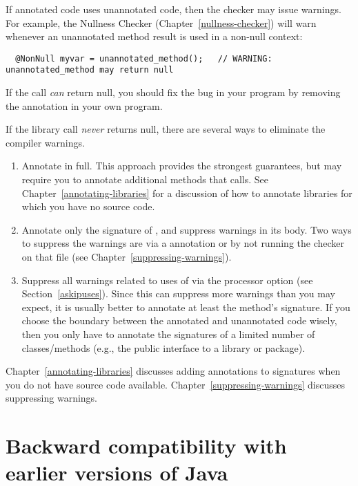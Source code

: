 If annotated code uses unannotated code, then the checker may issue
warnings.  For example, the Nullness Checker (Chapter~\ref{nullness-checker}) will
warn whenever an unannotated method result is used in a non-null context:

\begin{Verbatim}
  @NonNull myvar = unannotated_method();   // WARNING: unannotated_method may return null
\end{Verbatim}

If the call \emph{can} return null, you should fix the bug in your program by
removing the  annotation in your own program.

If the library call \emph{never} returns null,
there are several ways to eliminate the compiler warnings.
\begin{enumerate}
\item Annotate  in full.  This approach provides
  the strongest guarantees, but may require you to annotate additional
  methods that  calls.  See
  Chapter~\ref{annotating-libraries} for a discussion of how to annotate
  libraries for which you have no source code.
\item Annotate only the signature of , and
  suppress warnings in its body.  Two ways to suppress the warnings are via a
   annotation or by not running the checker on that
  file (see Chapter~\ref{suppressing-warnings}).
\item Suppress all warnings related to uses of 
  via the  processor option
  (see Section~\ref{askipuses}).
  Since this can suppress more warnings than you may expect,
  it is usually better to annotate at least the method's signature.  If you
  choose the boundary between the annotated and unannotated code wisely,
  then you only have to annotate the signatures of a limited number of
  classes/methods
  (e.g., the public interface to a library or package).

\end{enumerate}

Chapter~\ref{annotating-libraries} discusses adding annotations to
signatures when you do not have source code available.
Chapter~\ref{suppressing-warnings} discusses suppressing warnings.


\section{Backward compatibility with earlier versions of Java\label{backward-compatibility}}

